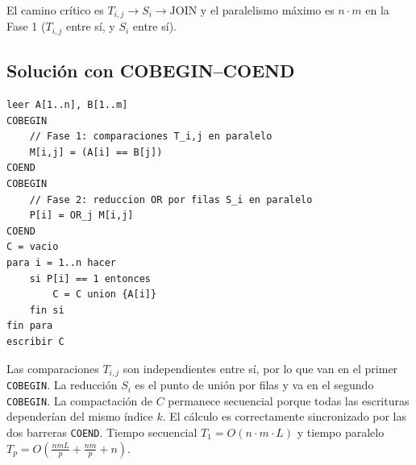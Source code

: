 El camino cr\'itico es $T_{i,j} \rightarrow S_i \rightarrow \text{JOIN}$ y el paralelismo m\'aximo es $n \cdot m$ en la Fase 1 ($T_{i,j}$ entre s\'i, y $S_i$ entre s\'i).

\subsection*{Soluci\'on con COBEGIN--COEND}
\begin{lstlisting}
leer A[1..n], B[1..m]
COBEGIN
    // Fase 1: comparaciones T_i,j en paralelo
    M[i,j] = (A[i] == B[j])
COEND
COBEGIN
    // Fase 2: reduccion OR por filas S_i en paralelo
    P[i] = OR_j M[i,j]
COEND
C = vacio
para i = 1..n hacer
    si P[i] == 1 entonces
        C = C union {A[i]}
    fin si
fin para
escribir C
\end{lstlisting}

\noindent
Las comparaciones $T_{i,j}$ son independientes entre s\'i, por lo que van en el primer \texttt{COBEGIN}. La reducci\'on $S_i$ es el punto de uni\'on por filas y va en el segundo \texttt{COBEGIN}. La compactaci\'on de $C$ permanece secuencial porque todas las escrituras depender\'ian del mismo \'indice $k$. El c\'alculo es correctamente sincronizado por las dos barreras \texttt{COEND}. Tiempo secuencial $T_1 = O(n \cdot m \cdot L)$ y tiempo paralelo $T_p = O(\frac{nmL}{p}+\frac{nm}{p}+n)$.
